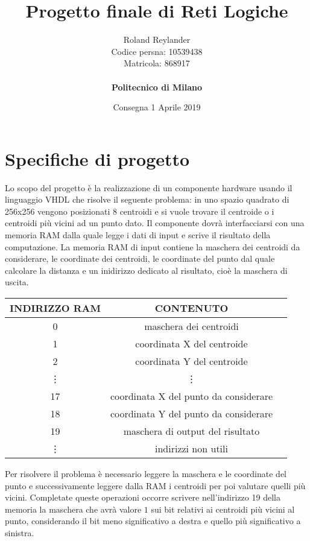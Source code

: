 \documentclass{article}
\title{\textbf{Progetto finale di Reti Logiche}}
\author{Roland Reylander \\
	Codice persna: 10539438 \\
	Matricola: 868917 \\
	\vspace*{0.5in} \\
	\textbf{Politecnico di Milano}}
\date{Consegna 1 Aprile 2019}
\begin{document}
	
	\maketitle
	\leavevmode
	
	\pagebreak
	\tableofcontents
	
	
	\pagebreak
	
	\section{Specifiche di progetto}
	Lo scopo del progetto \`e la realizzazione di un componente hardware usando il linguaggio VHDL che risolve il seguente problema: in uno spazio quadrato di 256x256 vengono posizionati 8 centroidi e si vuole trovare il centroide o i centroidi pi\`{u} vicini ad un punto dato.
	\newline
	Il componente dovr\`{a} interfacciarsi con una memoria RAM dalla quale legge i dati di input e scrive il risultato della computazione. La memoria RAM di input contiene la maschera dei centroidi da considerare, le coordinate dei centroidi, le coordinate del punto dal quale calcolare la distanza e un inidirizzo dedicato al risultato, cio\`{e} la maschera di uscita.
	\newline
	
	\renewcommand{\arraystretch}{1.5}
	\begin{center}
		
		\begin{tabular}{ |c|c|c| }
			\hline
			INDIRIZZO RAM & CONTENUTO \\ 
			\hline
			0 & maschera dei centroidi \\
			\hline
			1 & coordinata X del centroide \\
			\hline
			2 & coordinata Y del centroide \\
			\hline
			\vdots & \vdots \\
			\hline
			17 & coordinata X del punto da considerare \\
			\hline
			18 & coordinata Y del punto da considerare \\
			\hline
			19 & maschera di output del risultato \\
			\hline
			\vdots & indirizzi non utili \\
			\hline
		\end{tabular}
	\end{center}
	\leavevmode\newline
	Per risolvere il problema \`{e} necessario leggere la maschera e le coordinate del punto e successivamente leggere dalla RAM i centroidi per poi valutare quelli pi\`{u} vicini. Completate queste operazioni occorre scrivere nell'indirizzo 19 della memoria la maschera che avr\`{a} valore $1$ sui bit relativi ai centroidi pi\`{u} vicini al punto, considerando il bit meno significativo a destra e quello pi\`{u} significativo a sinistra.
	
\end{document}
